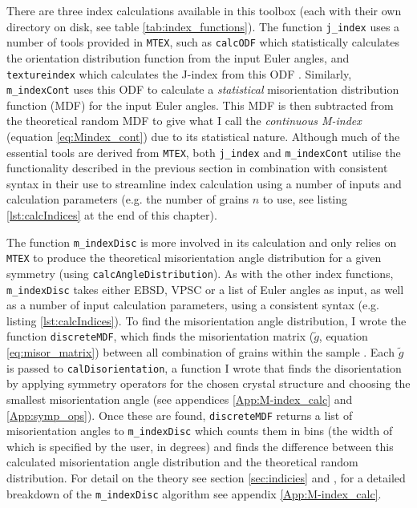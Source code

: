 \documentclass[a4paper,12pt,twoside]{report}
\numberwithin{equation}{chapter}
\begin{document}
There are three index calculations available in this toolbox (each with their own directory on disk, see table \ref{tab:index_functions}). The function \texttt{j\_{}index} uses a number of tools provided in \texttt{MTEX},  such as \texttt{calcODF} which statistically calculates the orientation distribution function from the input Euler angles, and \texttt{textureindex} which calculates the J-index from this ODF \citep[for details on their method of ODF calculation see][]{Hielscher2008}. Similarly, \texttt{m\_{}indexCont} uses this ODF to calculate a \emph{statistical} misorientation distribution function (MDF) for the input Euler angles.  This MDF is then subtracted from the theoretical random MDF to give what I call the \emph{continuous M-index} (equation \ref{eq:Mindex_cont}) due to its statistical nature.  Although much of the essential tools are derived from \texttt{MTEX}, both \texttt{j\_{}index} and \texttt{m\_{}indexCont} utilise the functionality described in the previous section in combination with consistent syntax in their use to streamline index calculation using a number of inputs and calculation parameters (e.g. the number of grains $n$ to use, see listing \ref{lst:calcIndices} at the end of this chapter).         

The function \texttt{m\_{}indexDisc} is more involved in its calculation and only relies on \texttt{MTEX} to produce the theoretical misorientation angle distribution for a given symmetry (using \texttt{calcAngleDistribution}). As with the other index functions, \texttt{m\_{}indexDisc} takes either EBSD, VPSC or a list of Euler angles as input, as well as a number of input calculation parameters, using a consistent syntax (e.g. listing \ref{lst:calcIndices}). To find the misorientation angle distribution, I wrote the function \texttt{discreteMDF}, which finds the misorientation matrix ($\tilde{g}$, equation \ref{eq:misor_matrix}) between all combination of grains within the sample \citep[uncorrelated misorientation angle distribution,][]{Mainprice}. Each $\tilde{g}$ is passed to \texttt{calDisorientation}, a function I wrote that finds the disorientation \citep{Grimmer1979} by applying symmetry operators for the chosen crystal structure and choosing the smallest misorientation angle (see appendices \ref{App:M-index_calc} and \ref{App:symp_ops}). Once these are found, \texttt{discreteMDF} returns a list of misorientation angles to \texttt{m\_{}indexDisc} which counts them in bins (the width of which is specified by the user, in degrees) and finds the difference between this calculated misorientation angle distribution and the theoretical random distribution. For detail on the theory see section \ref{sec:indicies} and \cite{Skemer}, for a detailed breakdown of the \texttt{m\_{}indexDisc} algorithm see appendix \ref{App:M-index_calc}.                                            
\end{document}

